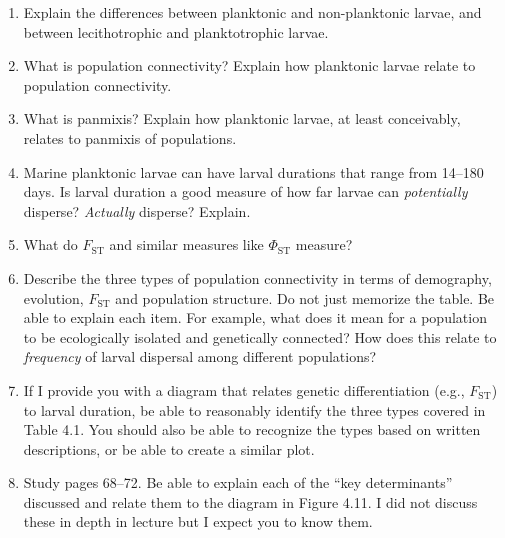 \documentclass[letterpaper]{tufte-handout}
\begin{document}
\begin{enumerate}

	\item Explain  the differences between planktonic and non-planktonic larvae, and between lecithotrophic and planktotrophic larvae.
	\item What is population connectivity? Explain how planktonic larvae relate to population connectivity.
	
	\item What is panmixis? Explain how planktonic larvae, at least conceivably, relates to panmixis of populations.
	
	\item Marine planktonic larvae can have larval durations that range from 14–180 days. Is larval duration a good measure of how far larvae can \emph{potentially} disperse? \emph{Actually} disperse? Explain.
	
	\item What do $F_\mathrm{ST}$  and similar measures like $\Phi_{\mathrm{ST}}$ measure? 
	
	\item Describe the three types of population connectivity in terms of demography, evolution, $F_{\mathrm{ST}}$ and population structure. Do not just memorize the table.  Be able to explain each item. For example, what does it mean for a population to be ecologically isolated and genetically connected? How does this relate to \emph{frequency} of larval dispersal among different populations?
	
	\item If I provide you with a diagram that relates genetic differentiation (e.g., $F_\mathrm{ST}$) to larval duration, be able to reasonably identify the three types covered in Table 4.1. You should also be able to recognize the types based on written descriptions, or be able to create a similar plot.

	\item Study pages 68–72. Be able to explain each of the ``key determinants'' discussed and relate them to the diagram in Figure 4.11. I did not discuss these in depth in lecture but I expect you to know them.
	

\end{enumerate}
\end{document}
